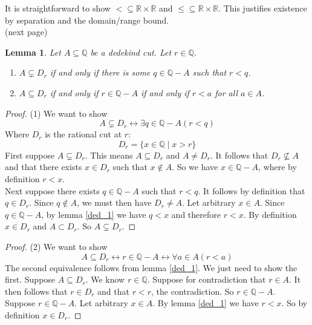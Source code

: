\documentclass{report}
\newtheorem{lemma}[theo]{Lemma}
\begin{document}
\noindent It is straightforward to show $<\subseteq\mathbb R\times\mathbb R$ and $\leq\subseteq\mathbb R\times\mathbb R$. 
This justifies existence by separation and the domain/range bound.\\
(next page)\newpage
\begin{lemma}\label{ded_2}
Let $A\subseteq\mathbb Q$ be a dedekind cut. Let $r\in\mathbb Q$.
\begin{enumerate}
\item $A\subsetneq D_r$ if and only if there is some $q\in\mathbb Q-A$ such that $r<q$.
\item $A\subseteq D_r$ if and only if $r\in\mathbb Q-A$ if and only if $r<a$ for all $a\in A$.
\end{enumerate}
\end{lemma}
\begin{proof}(1)
We want to show
\begin{equation*}
A\subsetneq D_r\leftrightarrow\exists q\in\mathbb Q-A(r<q)
\end{equation*}
Where $D_r$ is the rational cut at $r$:
\begin{equation*}
D_r=\{x\in\mathbb Q\mid x>r\}
\end{equation*}
First suppose $A\subsetneq D_r$. This means $A\subseteq D_r$ and $A\neq D_r$. It follows that $D_r\nsubseteq A$ and that there exists 
$x\in D_r$ such that $x\notin A$. So we have $x\in\mathbb Q-A$, where by definition $r<x$.\\
\indent Next suppose there exists $q\in\mathbb Q-A$ such that $r<q$. It follows by definition that $q\in D_r$. Since $q\notin A$, we must then have
$D_r\neq A$. Let arbitrary $x\in A$. Since $q\in\mathbb Q-A$, by lemma \ref{ded_1} we have $q<x$ and therefore $r<x$. By definition $x\in D_r$ and 
$A\subset D_r$. So $A\subsetneq D_r$.
\end{proof}
\begin{proof}(2)
We want to show
\begin{equation*}
A\subseteq D_r\leftrightarrow r\in\mathbb Q-A\leftrightarrow\forall a\in A(r<a)
\end{equation*}
The second equivalence follows from lemma \ref{ded_1}. We just need to show the first. Suppose $A\subseteq D_r$. We know $r\in\mathbb Q$. 
Suppose for contradiction that $r\in A$. It then follows that $r\in D_r$ and that $r<r$, the contradiction. So $r\in\mathbb Q-A$.\\
\indent Suppose $r\in\mathbb Q-A$. Let arbitrary $x\in A$. By lemma \ref{ded_1} we have $r<x$. So by definition $x\in D_r$.
\end{proof}
\end{document}
